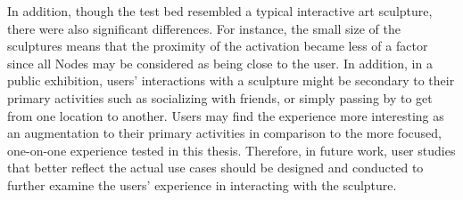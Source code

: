 In addition, though the test bed resembled a typical interactive art sculpture, there were also significant differences. For instance, the small size of the sculptures means that the proximity of the activation became less of a factor since all Nodes may be considered as being close to the user. In addition, in a public exhibition, users' interactions with a sculpture might be secondary to their primary activities such as socializing with friends, or simply passing by to get from one location to another. Users may find the experience more interesting as an augmentation to their primary activities in comparison to the more focused, one-on-one experience tested in this thesis. Therefore, in future work, user studies that better reflect the actual use cases should be designed and conducted to further examine the users' experience in interacting with the sculpture.


